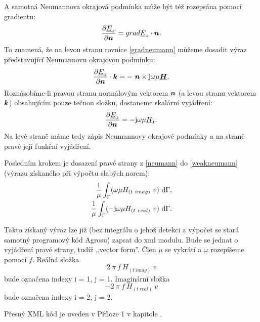 \documentclass[12pt,a4paper,oneside]{article}
\numberwithin{equation}{section} %
\numberwithin{figure}{section} %
\numberwithin{table}{section} %
\newcommand{\mj}{\mathrm{j}} %
\renewcommand{\vec}[1]{\mbox{\boldmath$#1$}} %
\newcommand{\faz}[1]{{\underline{#1}}} %
\begin{document}
A samotná Neumannova okrajová podmínka může být též rozepsána pomocí gradientu:
\begin{equation}
\label{gradneumann}
\frac{\partial \faz{E}_z}{\partial \vec{n}} = grad \faz{E}_z \cdot \vec{n} .
\end{equation}
To znamená, že na levou stranu rovnice \ref{gradneumann} můžeme dosadit výraz představující Neumannovu okrajovou podmínku:
\begin{equation}
\label{NeumannEKvek}
\frac{\partial \faz{E}_z}{\partial \vec{n}} \cdot \vec{k} = - ~ \vec{n} \times \mj \omega \mu \faz{\vec{H}}.
\end{equation}
Roznásobíme-li pravou stranu normálovým vektorem $\vec{n}$ (a levou stranu vektorem $\vec{k}$) obsahujícím pouze tečnou složku, dostaneme skalární vyjádření:
\begin{equation}
\label{neumann}
\frac{\partial \faz{E}_z}{\partial \vec{n}} = - \mj \omega \mu \faz{H}_t .
\end{equation}
Na levé straně máme tedy zápis Neumannovy okrajové podmínky a na straně pravé její funkční vyjádření.

Posledním krokem je dosazení pravé strany z \ref{neumann} do \ref{weakneumann} (výrazu získaného při výpočtu slabých norem):
\begin{subequations}
\begin{align}
\frac{1}{\mu} \int _{\Gamma} ( \omega \mu H_{(t~imag)} ~ v ) ~ \ud \Gamma ,
\\ 
\frac{1}{\mu} \int _{\Gamma} ( - \mj \omega \mu H_{(t~real)} ~ v ) ~ \ud \Gamma .
\end{align}
\end{subequations}

Takto získaný výraz lze již (bez integrálu o jehož detekci a výpočet se stará samotný programový kód Agrosu) zapsat do xml modulu. Bude se jednat o vyjádření pravé strany, tudíž ,,vector form''. Člen $\mu$ se vykrátí a $\omega$ rozepíšeme pomocí $f$. Reálná složka 
\begin{equation}
2 ~ \pi ~ f ~ H_{(t~imag)} ~ v
\end{equation} 
bude označena indexy i = 1, j = 1. Imaginární složka 
\begin{equation}
- 2 ~ \pi ~ f ~ H_{(t~real)} ~ v
\end{equation}
bude označena indexy i = 2, j = 2.

Přesný XML kód je uveden v Příloze 1 v kapitole .
\end{document}
